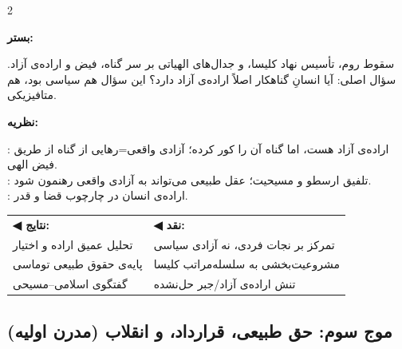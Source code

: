 \begin{tcolorbox}[mybox, title={موج دوم | قرون وسطی | \lr{500 -- 1400 AD}},
  colframe=EraMedieval, colback=EraMedieval!5,
  boxed title style={colback=EraMedieval}]

\begin{multicols}{2}

\textbf{\color{EraMedieval}بستر:}

سقوط روم، تأسیس نهاد کلیسا، و جدال‌های الهیاتی بر سر گناه، فیض و اراده‌ی آزاد. سؤال اصلی: آیا انسانِ گناهکار اصلاً اراده‌ی آزاد دارد؟ این سؤال هم سیاسی بود، هم متافیزیکی.

\columnbreak

\textbf{\color{EraMedieval}نظریه:}

: اراده‌ی آزاد هست، اما گناه آن را کور کرده؛ آزادی واقعی=رهایی از گناه از طریق فیض الهی.\\
: تلفیق ارسطو و مسیحیت؛ عقل طبیعی می‌تواند به آزادی واقعی رهنمون شود.\\
: اراده‌ی انسان در چارچوب قضا و قدر.

\end{multicols}

\vspace{0.3cm}
\begin{tabular}{p{5cm}p{5cm}}
\textcolor{AccentGreen}{\textbf{◀ نتایج:}} & \textcolor{AccentRed}{\textbf{◀ نقد:}} \\
تحلیل عمیق اراده و اختیار & تمرکز بر نجات فردی، نه آزادی سیاسی \\
پایه‌ی حقوق طبیعی توماسی & مشروعیت‌بخشی به سلسله‌مراتب کلیسا \\
گفتگوی اسلامی–مسیحی & تنش اراده‌ی آزاد/جبر حل‌نشده \\
\end{tabular}

\end{tcolorbox}

\subsection{موج سوم: حق طبیعی، قرارداد، و انقلاب (مدرن اولیه)}
\label{subsec:wave3}

